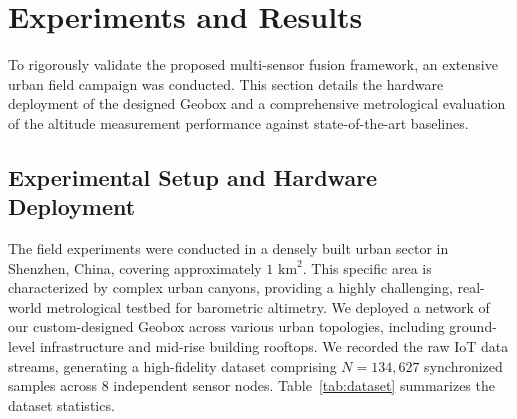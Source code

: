 




\section{Experiments and Results}
\label{sec:experiments}

To rigorously validate the proposed multi-sensor fusion framework, an extensive urban field campaign was conducted. This section details the hardware deployment of the designed Geobox and a comprehensive metrological evaluation of the altitude measurement performance against state-of-the-art baselines.

\subsection{Experimental Setup and Hardware Deployment}
\label{subsec:exp_setup}

The field experiments were conducted in a densely built urban sector in Shenzhen, China, covering approximately $1 \text{ km}^2$. This specific area is characterized by complex urban canyons, providing a highly challenging, real-world metrological testbed for barometric altimetry. We deployed a network of our custom-designed Geobox across various urban topologies, including ground-level infrastructure and mid-rise building rooftops. We recorded the raw IoT data streams, generating a high-fidelity dataset comprising $N = 134,627$ synchronized samples across 8 independent sensor nodes. Table~\ref{tab:dataset} summarizes the dataset statistics.

